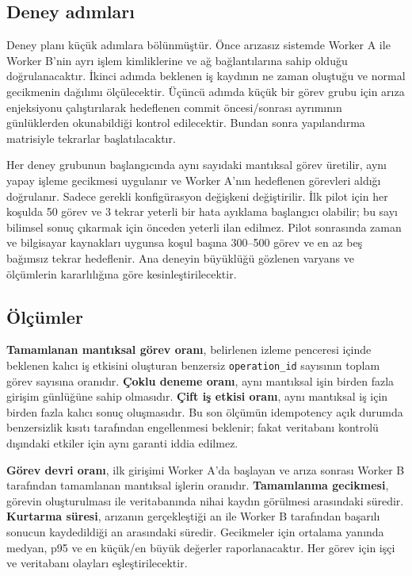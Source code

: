 \documentclass[conference,a4paper]{IEEEtran}
\newcommand{\code}[1]{\texttt{#1}}
\begin{document}
\subsection{Deney adımları}
Deney planı küçük adımlara bölünmüştür. Önce arızasız sistemde Worker A ile Worker B'nin ayrı işlem kimliklerine ve ağ bağlantılarına sahip olduğu doğrulanacaktır. İkinci adımda beklenen iş kaydının ne zaman oluştuğu ve normal gecikmenin dağılımı ölçülecektir. Üçüncü adımda küçük bir görev grubu için arıza enjeksiyonu çalıştırılarak hedeflenen commit öncesi/sonrası ayrımının günlüklerden okunabildiği kontrol edilecektir. Bundan sonra yapılandırma matrisiyle tekrarlar başlatılacaktır.

Her deney grubunun başlangıcında aynı sayıdaki mantıksal görev üretilir, aynı yapay işleme gecikmesi uygulanır ve Worker A'nın hedeflenen görevleri aldığı doğrulanır. Sadece gerekli konfigürasyon değişkeni değiştirilir. İlk pilot için her koşulda 50 görev ve 3 tekrar yeterli bir hata ayıklama başlangıcı olabilir; bu sayı bilimsel sonuç çıkarmak için önceden yeterli ilan edilmez. Pilot sonrasında zaman ve bilgisayar kaynakları uygunsa koşul başına 300--500 görev ve en az beş bağımsız tekrar hedeflenir. Ana deneyin büyüklüğü gözlenen varyans ve ölçümlerin kararlılığına göre kesinleştirilecektir.

\subsection{Ölçümler}
\textbf{Tamamlanan mantıksal görev oranı}, belirlenen izleme penceresi içinde beklenen kalıcı iş etkisini oluşturan benzersiz \code{operation\_id} sayısının toplam görev sayısına oranıdır. \textbf{Çoklu deneme oranı}, aynı mantıksal işin birden fazla girişim günlüğüne sahip olmasıdır. \textbf{Çift iş etkisi oranı}, aynı mantıksal iş için birden fazla kalıcı sonuç oluşmasıdır. Bu son ölçümün idempotency açık durumda benzersizlik kısıtı tarafından engellenmesi beklenir; fakat veritabanı kontrolü dışındaki etkiler için aynı garanti iddia edilmez.

\textbf{Görev devri oranı}, ilk girişimi Worker A'da başlayan ve arıza sonrası Worker B tarafından tamamlanan mantıksal işlerin oranıdır. \textbf{Tamamlanma gecikmesi}, görevin oluşturulması ile veritabanında nihai kaydın görülmesi arasındaki süredir. \textbf{Kurtarma süresi}, arızanın gerçekleştiği an ile Worker B tarafından başarılı sonucun kaydedildiği an arasındaki süredir. Gecikmeler için ortalama yanında medyan, p95 ve en küçük/en büyük değerler raporlanacaktır. Her görev için işçi ve veritabanı olayları eşleştirilecektir.
\end{document}
